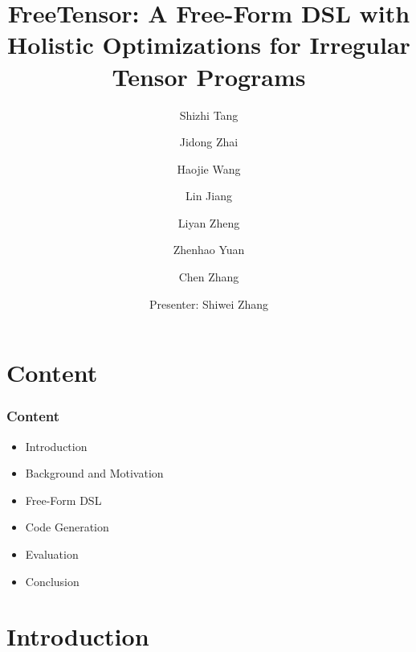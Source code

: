 \documentclass[12pt,aspectratio=169]{beamer}
\title{FreeTensor: A Free-Form DSL with Holistic Optimizations for Irregular Tensor Programs}
\author{Shizhi Tang\inst{1}\and Jidong Zhai\inst{1}\and Haojie Wang\inst{1}\and Lin Jiang\inst{1}\and Liyan Zheng\inst{1}\and Zhenhao Yuan\inst{1}\and Chen Zhang\inst{1}}
\institute{\inst{1}Tsinghua University}
\date{Presenter: Shiwei Zhang}
\begin{document}
    \beamertemplatenavigationsymbolsempty

    \makeatletter
    \def\beamer@andinst{\\[.1em]}
    \makeatother

    \begin{frame}
        \titlepage
    \end{frame}



    \section*{Content}

    \begin{frame}
        \frametitle{Content}

        \begin{itemize}
            \setlength{\itemsep}{.8em}
            \item Introduction
            \item Background and Motivation
            \item Free-Form DSL
            \item Code Generation
            \item Evaluation
            \item Conclusion
        \end{itemize}
    \end{frame}



    \section{Introduction}
\end{document}
